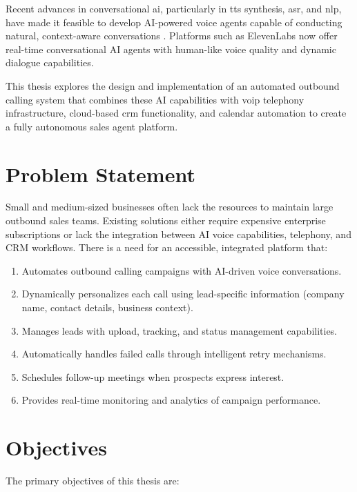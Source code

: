 \documentclass[12pt,a4paper,oneside]{book}
\begin{document}
Recent advances in conversational \gls{ai}, particularly in \gls{tts} synthesis, \gls{asr}, and \gls{nlp}, have made it feasible to develop AI-powered voice agents capable of conducting natural, context-aware conversations \citep{zhang2023survey}. Platforms such as ElevenLabs now offer real-time conversational AI agents with human-like voice quality and dynamic dialogue capabilities.

This thesis explores the design and implementation of an automated outbound calling system that combines these AI capabilities with \gls{voip} telephony infrastructure, cloud-based \gls{crm} functionality, and calendar automation to create a fully autonomous sales agent platform.

\section{Problem Statement}

Small and medium-sized businesses often lack the resources to maintain large outbound sales teams. Existing solutions either require expensive enterprise subscriptions or lack the integration between AI voice capabilities, telephony, and CRM workflows. There is a need for an accessible, integrated platform that:

\begin{enumerate}
    \item Automates outbound calling campaigns with AI-driven voice conversations.
    \item Dynamically personalizes each call using lead-specific information (company name, contact details, business context).
    \item Manages leads with upload, tracking, and status management capabilities.
    \item Automatically handles failed calls through intelligent retry mechanisms.
    \item Schedules follow-up meetings when prospects express interest.
    \item Provides real-time monitoring and analytics of campaign performance.
\end{enumerate}

\section{Objectives}

The primary objectives of this thesis are:
\end{document}
